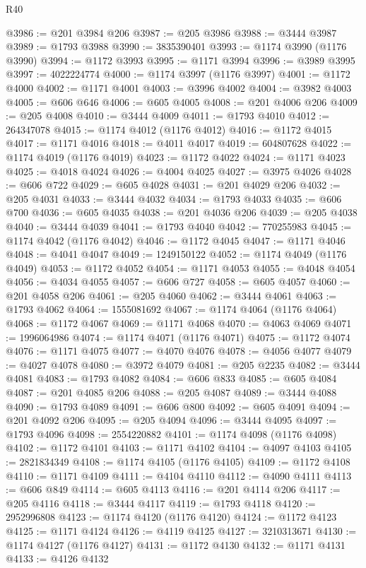 \begin{lexlean}{R40}
\begin{coremodule}
@3986 := @201 @3984 @206
@3987 := @205 @3986
@3988 := @3444 @3987
@3989 := @1793 @3988
@3990 := 3835390401
@3993 := @1174 @3990 (@1176 @3990)
@3994 := @1172 @3993
@3995 := @1171 @3994
@3996 := @3989 @3995
@3997 := 4022224774
@4000 := @1174 @3997 (@1176 @3997)
@4001 := @1172 @4000
@4002 := @1171 @4001
@4003 := @3996 @4002
@4004 := @3982 @4003
@4005 := @606 @646
@4006 := @605 @4005
@4008 := @201 @4006 @206
@4009 := @205 @4008
@4010 := @3444 @4009
@4011 := @1793 @4010
@4012 := 264347078
@4015 := @1174 @4012 (@1176 @4012)
@4016 := @1172 @4015
@4017 := @1171 @4016
@4018 := @4011 @4017
@4019 := 604807628
@4022 := @1174 @4019 (@1176 @4019)
@4023 := @1172 @4022
@4024 := @1171 @4023
@4025 := @4018 @4024
@4026 := @4004 @4025
@4027 := @3975 @4026
@4028 := @606 @722
@4029 := @605 @4028
@4031 := @201 @4029 @206
@4032 := @205 @4031
@4033 := @3444 @4032
@4034 := @1793 @4033
@4035 := @606 @700
@4036 := @605 @4035
@4038 := @201 @4036 @206
@4039 := @205 @4038
@4040 := @3444 @4039
@4041 := @1793 @4040
@4042 := 770255983
@4045 := @1174 @4042 (@1176 @4042)
@4046 := @1172 @4045
@4047 := @1171 @4046
@4048 := @4041 @4047
@4049 := 1249150122
@4052 := @1174 @4049 (@1176 @4049)
@4053 := @1172 @4052
@4054 := @1171 @4053
@4055 := @4048 @4054
@4056 := @4034 @4055
@4057 := @606 @727
@4058 := @605 @4057
@4060 := @201 @4058 @206
@4061 := @205 @4060
@4062 := @3444 @4061
@4063 := @1793 @4062
@4064 := 1555081692
@4067 := @1174 @4064 (@1176 @4064)
@4068 := @1172 @4067
@4069 := @1171 @4068
@4070 := @4063 @4069
@4071 := 1996064986
@4074 := @1174 @4071 (@1176 @4071)
@4075 := @1172 @4074
@4076 := @1171 @4075
@4077 := @4070 @4076
@4078 := @4056 @4077
@4079 := @4027 @4078
@4080 := @3972 @4079
@4081 := @205 @2235
@4082 := @3444 @4081
@4083 := @1793 @4082
@4084 := @606 @833
@4085 := @605 @4084
@4087 := @201 @4085 @206
@4088 := @205 @4087
@4089 := @3444 @4088
@4090 := @1793 @4089
@4091 := @606 @800
@4092 := @605 @4091
@4094 := @201 @4092 @206
@4095 := @205 @4094
@4096 := @3444 @4095
@4097 := @1793 @4096
@4098 := 2554220882
@4101 := @1174 @4098 (@1176 @4098)
@4102 := @1172 @4101
@4103 := @1171 @4102
@4104 := @4097 @4103
@4105 := 2821834349
@4108 := @1174 @4105 (@1176 @4105)
@4109 := @1172 @4108
@4110 := @1171 @4109
@4111 := @4104 @4110
@4112 := @4090 @4111
@4113 := @606 @849
@4114 := @605 @4113
@4116 := @201 @4114 @206
@4117 := @205 @4116
@4118 := @3444 @4117
@4119 := @1793 @4118
@4120 := 2952996808
@4123 := @1174 @4120 (@1176 @4120)
@4124 := @1172 @4123
@4125 := @1171 @4124
@4126 := @4119 @4125
@4127 := 3210313671
@4130 := @1174 @4127 (@1176 @4127)
@4131 := @1172 @4130
@4132 := @1171 @4131
@4133 := @4126 @4132

\end{coremodule}
\end{lexlean}
